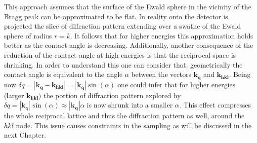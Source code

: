 This approach assumes that the surface of the Ewald sphere in the vicinity of the Bragg peak can be approximated to be flat. 
In reality onto the detector is projected the slice of diffraction pattern extending over a swathe of the Ewald sphere of 
radius $r = k$. It follows that for higher energies this approximation holds better as the contact angle is decreasing. 
Additionally, another consequence of the reduction of the contact angle at high energies is that the reciprocal space 
is shrinking. In order to understand this one can consider that:
geometrically the contact angle is equivalent to the angle $\alpha$ between the vectors $\mathbf{k}_\mathbf{q}$ and $\mathbf{k}_\mathbf{hkl}$. 
Being now $\delta q = |\mathbf{k}_\mathbf{q} - \mathbf{k}_\mathbf{hkl}| = |\mathbf{k}_\mathbf{q}|\sin (\alpha)$ one 
could infer that for higher energies (larger $\mathbf{k}_\mathbf{hkl})$ the portion of diffraction pattern 
explored by $\delta q = |\mathbf{k}_\mathbf{q}|\sin (\alpha) \approx |\mathbf{k}_\mathbf{q}|\alpha$ 
is now shrunk into a smaller $\alpha$. This effect compresses the whole reciprocal lattice and thus the  
diffraction pattern as well, around the $hkl$ node. This issue causes constraints in the sampling as will be discussed 
in the next Chapter.




